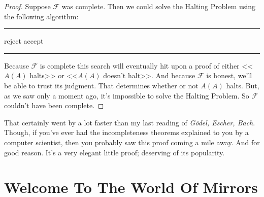 \documentclass{article}
\theoremstyle{customstyle}
\newcommand{\F}{\ensuremath{\mathcal{F}}}
\newenvironment{algo}{\begin{samepage}\medskip\hrule\begin{algorithmic}}{\end{algorithmic}\hrule\medskip\end{samepage}}
\begin{document}
\begin{proof}
Suppose $\F$ was complete. Then we could solve the Halting Problem using the following algorithm:
\begin{algo}
      \State reject
    \EndIf
      \State accept
    \EndIf
  \EndFor
\EndFunction
\end{algo}
Because $\F$ is complete this search will eventually hit upon a proof of  either <<$A(A)$ halts>> or <<$A(A)$ doesn't halt>>. And because $\F$ is honest, we'll be able to trust its judgment. That determines whether or not $A(A)$ halts. But, as we saw only a moment ago, it's impossible to solve the Halting Problem. So $\F$ couldn't have been complete. \lightning
\end{proof}

That certainly went by a lot faster than my last reading of \textit{Gödel, Escher, Bach}. Though, if you've ever had the incompleteness theorems explained to you by a computer scientist, then you probably saw this proof coming a mile away. And for good reason. It's a very elegant little proof; deserving of its popularity.

\newpage
\section{Welcome To The World Of Mirrors}
\end{document}
